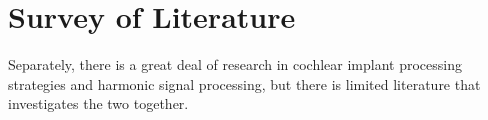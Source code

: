 \documentclass [11pt, proquest,oneside] {ganter_thesis}[2015/03/03]
\begin{document}











\section{Survey of Literature}

Separately, there is a great deal of research in cochlear implant processing strategies and harmonic signal processing, but there is limited literature that investigates the two together.
\end{document}
